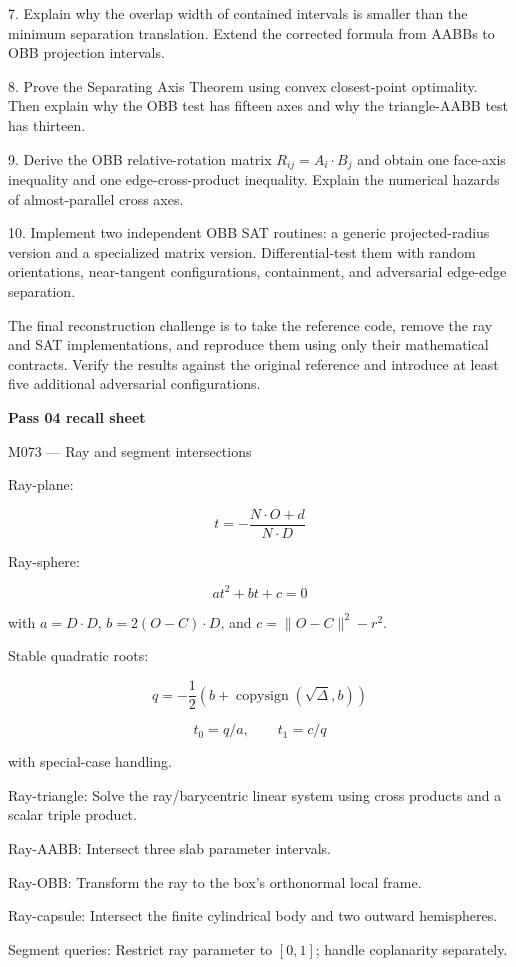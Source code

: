 7. Explain why the overlap width of contained intervals is smaller than the minimum separation translation. Extend the corrected formula from AABBs to OBB projection intervals.

8. Prove the Separating Axis Theorem using convex closest-point optimality. Then explain why the OBB test has fifteen axes and why the triangle-AABB test has thirteen.

9. Derive the OBB relative-rotation matrix \(R_{ij}=A_i\cdot B_j\) and obtain one face-axis inequality and one edge-cross-product inequality. Explain the numerical hazards of almost-parallel cross axes.

10. Implement two independent OBB SAT routines: a generic projected-radius version and a specialized matrix version. Differential-test them with random orientations, near-tangent configurations, containment, and adversarial edge-edge separation.

The final reconstruction challenge is to take the reference code, remove the ray and SAT implementations, and reproduce them using only their mathematical contracts. Verify the results against the original reference and introduce at least five additional adversarial configurations.

\textbf{Pass 04 recall sheet}

M073 --- Ray and segment intersections

Ray-plane:

\[
\boxed{t=-\frac{N\cdot O+d}{N\cdot D}}
\]

Ray-sphere:

\[
at^2+bt+c=0
\]

with \(a=D\cdot D\), \(b=2(O-C)\cdot D\), and \(c=\|O-C\|^2-r^2\).

Stable quadratic roots:

\[
q=-\frac12(b+\operatorname{copysign}(\sqrt\Delta,b))
\]

\[
t_0=q/a,\qquad t_1=c/q
\]

with special-case handling.

Ray-triangle: Solve the ray/barycentric linear system using cross products and a scalar triple product.

Ray-AABB: Intersect three slab parameter intervals.

Ray-OBB: Transform the ray to the box's orthonormal local frame.

Ray-capsule: Intersect the finite cylindrical body and two outward hemispheres.

Segment queries: Restrict ray parameter to \([0,1]\); handle coplanarity separately.

